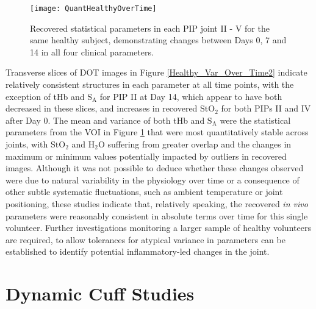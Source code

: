 \documentclass[twoside]{bhamthesis}
\theoremstyle{definition}
\begin{document}
\begin{figure}[!ht]
\centering\texttt{[image: QuantHealthyOverTime]}
\caption{Recovered statistical parameters in each PIP joint II - V for the same healthy subject, demonstrating changes between Days 0, 7 and 14 in all four clinical parameters.}
\label{QuantHealthyOverTime}
\end{figure}

Transverse slices of DOT images in Figure 
\ref{Healthy_Var_Over_Time2} indicate relatively consistent structures in each parameter at all time points, with the exception of tHb and $\mathrm{S_A}$ for PIP II at Day 14, which appear to have both decreased in these slices, and increases in recovered $\mathrm{StO_2}$ for both PIPs II and IV after Day 0. The mean and variance of both tHb and $\mathrm{S_A}$ were the statistical parameters from the VOI in Figure \ref{QuantHealthyOverTime} that were most quantitatively stable across joints, with $\mathrm{StO_2}$ and $\mathrm{H_2O}$ suffering from greater overlap and the changes in maximum or minimum values potentially impacted by outliers in recovered images. Although it was not possible to deduce whether these changes observed were due to natural variability in the physiology over time or a consequence of other subtle systematic fluctuations, such as ambient temperature or joint positioning, these studies indicate that, relatively speaking, the recovered \textit{in vivo} parameters were reasonably consistent in absolute terms over time for this single volunteer. Further investigations monitoring a larger sample of healthy volunteers are required, to allow tolerances for atypical variance in parameters can be established to identify potential inflammatory-led changes in the joint.

\section{Dynamic Cuff Studies}
\end{document}
